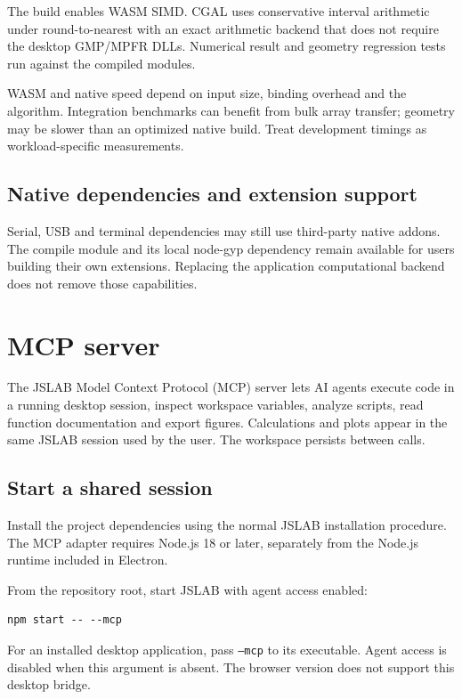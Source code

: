 \documentclass[12pt,a4paper]{article}
\begin{document}
The build enables WASM SIMD. CGAL uses conservative interval arithmetic under round-to-nearest with an exact arithmetic backend that does not require the desktop GMP/MPFR DLLs. Numerical result and geometry regression tests run against the compiled modules.

WASM and native speed depend on input size, binding overhead and the algorithm. Integration benchmarks can benefit from bulk array transfer; geometry may be slower than an optimized native build. Treat development timings as workload-specific measurements.


\subsection{Native dependencies and extension support}

Serial, USB and terminal dependencies may still use third-party native addons. The compile module and its local node-gyp dependency remain available for users building their own extensions. Replacing the application computational backend does not remove those capabilities.




\section{MCP server}

The JSLAB Model Context Protocol (MCP) server lets AI agents execute code in a running desktop session, inspect workspace variables, analyze scripts, read function documentation and export figures. Calculations and plots appear in the same JSLAB session used by the user. The workspace persists between calls.


\subsection{Start a shared session}

Install the project dependencies using the normal JSLAB installation procedure. The MCP adapter requires Node.js 18 or later, separately from the Node.js runtime included in Electron.

From the repository root, start JSLAB with agent access enabled:

\begin{lstlisting}[style=JavaScriptStyle,language={}]
npm start -- --mcp
\end{lstlisting}

For an installed desktop application, pass \texttt{--mcp} to its executable. Agent access is disabled when this argument is absent. The browser version does not support this desktop bridge.
\end{document}
